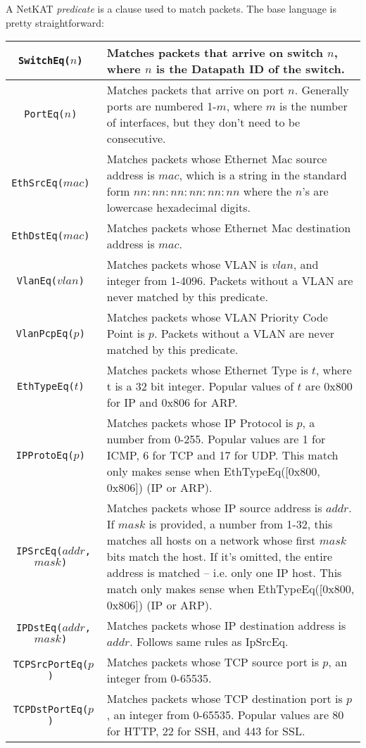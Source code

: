 A NetKAT \textit{predicate} is a clause used to match packets.
The base language is pretty straightforward:

\bigskip
\begin{tabularx}{6in}{|c|X|}
\hline\hline
\tt{SwitchEq($n$)} & Matches packets that arrive on switch $n$, where $n$ is the Datapath ID of the switch.  
\\ \hline
\tt{PortEq($n$)} & Matches packets that arrive on port $n$.  Generally ports are numbered 1-$m$, where $m$ is the
number of interfaces, but they don't need to be consecutive.  
\\ \hline
\tt{EthSrcEq($mac$)} & Matches packets whose Ethernet Mac source address is $mac$, which is a string in the standard form $nn:nn:nn:nn:nn:nn$ where the $n$'s are lowercase hexadecimal digits.
\\ \hline
\tt{EthDstEq($mac$)} & Matches packets whose Ethernet Mac destination address is $mac$.
\\ \hline
\tt{VlanEq($vlan$)} & Matches packets whose VLAN is $vlan$, and integer from 1-4096.  Packets without a VLAN are never matched by this predicate.
\\ \hline
\tt{VlanPcpEq($p$)} & Matches packets whose VLAN Priority Code Point is $p$.  Packets without a VLAN are never matched by this predicate.
\\ \hline
\tt{EthTypeEq($t$)} & Matches packets whose Ethernet Type is $t$, where t is a 32 bit integer.  Popular values of $t$ are 0x800 for IP and 0x806 for ARP.  
\\ \hline
\tt{IPProtoEq($p$)} & Matches packets whose IP Protocol is $p$, a number from 0-255.  
Popular values are 1 for ICMP, 6 for TCP and 17 for UDP.  
This match only makes sense when EthTypeEq([0x800, 0x806]) (IP or ARP). 
\\ \hline
\tt{IPSrcEq($addr$, $mask$)} & Matches packets whose IP source address is $addr$.  
If $mask$ is provided, a number from 1-32, this matches all hosts on a network whose first $mask$ bits match the host.
If it's omitted, the entire address is matched -- i.e. only one IP host.  
This match only makes sense when EthTypeEq([0x800, 0x806]) (IP or ARP). 
\\ \hline
\tt{IPDstEq($addr$, $mask$)} & Matches packets whose IP destination address is $addr$.  
Follows same rules as IpSrcEq.
\\ \hline
\tt{TCPSrcPortEq($p$)} & Matches packets whose TCP source port is $p$, an integer from 0-65535.
\\ \hline
\tt{TCPDstPortEq($p$)} & Matches packets whose TCP destination port is $p$, an integer from 0-65535.
Popular values are 80 for HTTP, 22 for SSH, and 443 for SSL.  
\\ \hline\hline
\end{tabularx}

